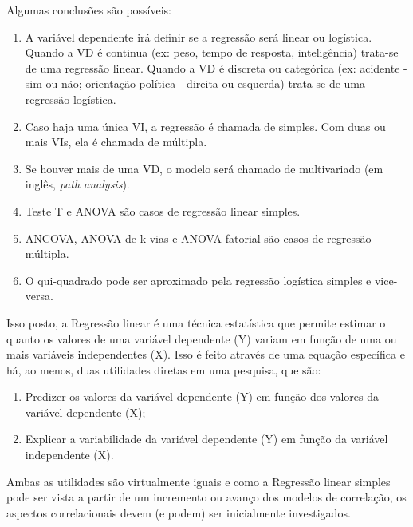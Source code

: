 \documentclass[
]{book}
\providecommand{\tightlist}{%
  \setlength{\itemsep}{0pt}\setlength{\parskip}{0pt}}
\begin{document}
Algumas conclusões são possíveis:

\begin{enumerate}
\def\labelenumi{\arabic{enumi}.}
\tightlist
\item
  A variável dependente irá definir se a regressão será linear ou logística. Quando a VD é continua (ex: peso, tempo de resposta, inteligência) trata-se de uma regressão linear. Quando a VD é discreta ou categórica (ex: acidente - sim ou não; orientação política - direita ou esquerda) trata-se de uma regressão logística.\\
\item
  Caso haja uma única VI, a regressão é chamada de simples. Com duas ou mais VIs, ela é chamada de múltipla.\\
\item
  Se houver mais de uma VD, o modelo será chamado de multivariado (em inglês, \emph{path analysis}).\\
\item
  Teste T e ANOVA são casos de regressão linear simples.\\
\item
  ANCOVA, ANOVA de k vias e ANOVA fatorial são casos de regressão múltipla.\\
\item
  O qui-quadrado pode ser aproximado pela regressão logística simples e vice-versa.
\end{enumerate}

Isso posto, a Regressão linear é uma técnica estatística que permite estimar o quanto os valores de uma variável dependente (Y) variam em função de uma ou mais variáveis independentes (X). Isso é feito através de uma equação específica e há, ao menos, duas utilidades diretas em uma pesquisa, que são:

\begin{enumerate}
\def\labelenumi{(\roman{enumi})}
\tightlist
\item
  Predizer os valores da variável dependente (Y) em função dos valores da variável dependente (X);\\
\item
  Explicar a variabilidade da variável dependente (Y) em função da variável independente (X).
\end{enumerate}

Ambas as utilidades são virtualmente iguais e como a Regressão linear simples pode ser vista a partir de um incremento ou avanço dos modelos de correlação, os aspectos correlacionais devem (e podem) ser inicialmente investigados.
\end{document}
